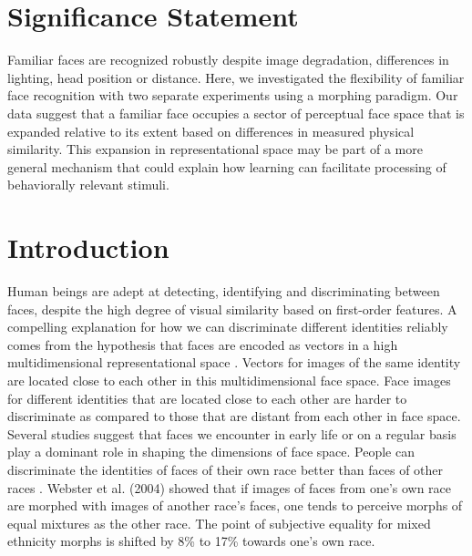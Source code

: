 \documentclass[10pt,letterpaper]{article}
\begin{document}
\section*{Significance Statement}
Familiar faces are recognized robustly despite image degradation, differences in lighting, head position or distance.  Here, we investigated the flexibility of familiar face recognition with two separate experiments using a morphing paradigm. Our data suggest that a familiar face occupies a sector of perceptual face space that is expanded relative to its extent based on differences in measured physical similarity. This expansion in representational space may be part of a more general mechanism that could explain how learning can facilitate processing of behaviorally relevant stimuli.

\linenumbers

\section*{Introduction}
Human beings are adept at detecting, identifying and discriminating between faces, despite the high degree of visual similarity based on first-order features. A compelling explanation for how we can discriminate different identities reliably comes from the hypothesis that faces are encoded as vectors in a high multidimensional representational space \cite{valentine1991unified, lee2000caricature, leopold2001prototype, jiang2007role}. Vectors for images of the same identity are located close to each other in this multidimensional face space.  Face images for different identities that are located close to each other are harder to discriminate as compared to those that are distant from each other in face space.  Several studies suggest that faces we encounter in early life \cite{slater2010shaping} or on a regular basis \cite{o1994structural} play a dominant role in shaping the dimensions of face space.  People can discriminate the identities of faces of their own race better than faces of other races \cite{feingold1914influence, rhodes1989race}. Webster et al. (2004) \cite{webster2004adaptation} showed that if images of faces from one’s own race are morphed with images of another race’s faces, one tends to perceive morphs of equal mixtures as the other race.  The point of subjective equality for mixed ethnicity morphs is shifted by 8\% to 17\% towards one’s own race. 
\end{document}
